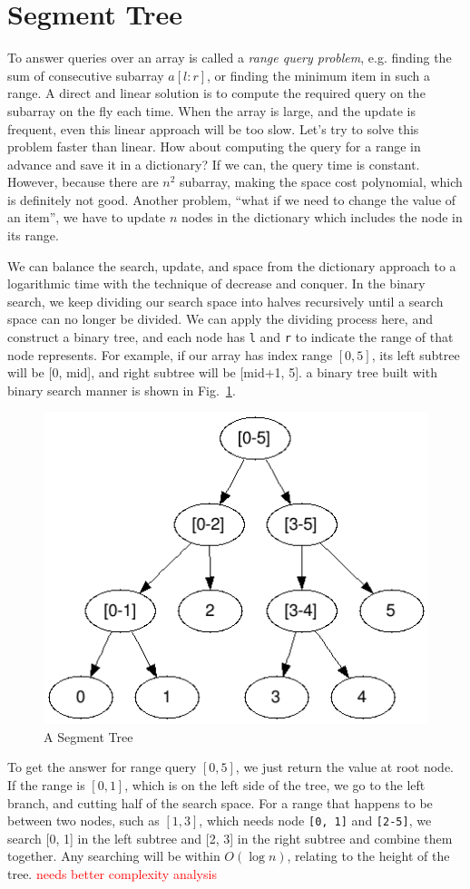 \documentclass[main.tex]{subfiles}
\begin{document}
\section{Segment Tree}
\label{sec_segment_tree}
To answer queries over an array is called a \textit{range query problem}, e.g. finding the sum of consecutive subarray $a[l:r]$, or finding the minimum item in such a range. A direct and linear solution is to compute the required query on the subarray on the fly each time. When the array is large, and the update is frequent, even this linear approach will be too slow. Let's try to solve this problem faster than linear. How about computing the query for a range in advance and save it in a dictionary? If we can, the query time is constant. However, because there are $n^2$ subarray, making the space cost polynomial, which is definitely not good.  Another problem, ``what if we need to change the value of an item'', we have to update $n$ nodes in the dictionary which includes the node in its range. 

We can balance the search, update, and space from the dictionary approach to a logarithmic time with the technique of decrease and conquer. In the binary search, we keep dividing our search space into halves recursively until a search space can no longer be divided. We can apply the dividing process here, and construct a binary tree, and each node has \texttt{l} and \texttt{r} to indicate the range of that node represents. For example, if our array has index range $[0, 5]$,  its left subtree will be [0, mid], and right subtree will be [mid+1, 5]. a binary tree built with binary search manner is shown in Fig.~\ref{fig:segment_tree_range}.
\begin{figure}[H]
    \centering
    \includegraphics[width=0.6\columnwidth]{fig/segment_tree_range.png}
    \caption{A Segment Tree }
    \label{fig:segment_tree_range}
\end{figure}
To get the answer for range query $[0, 5]$, we just return the value at root node. If the range is $[0, 1]$, which is on the left side of the tree, we go to the left branch, and cutting half of the search space. For a range that happens to be between two nodes, such as $[1, 3]$, which needs node \texttt{[0, 1]} and \texttt{[2-5]}, we search [0, 1] in the left subtree and [2, 3] in the right subtree and combine them together. Any searching will be within $O(\log n)$, relating to the height of the tree. \textcolor{red}{needs better complexity analysis} 
\end{document}
